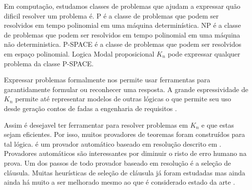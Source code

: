 



Em computação, estudamos classes de problemas que ajudam a expressar quão dificil resolver um problema é. P é a classe de problemas que podem ser resolvidos em tempo polinomial em uma máquina determinística. NP é a classe de problemas que podem ser resolvidos em tempo polinomial em uma máquina não deterministica. P-SPACE é a classe de problemas que podem ser resolvidos em espaço polinomial. %
Logica Modal proposicional $K_n$ pode expressar qualquer problema da classe P-SPACE. %

Expressar problemas formalmente nos permite usar ferramentas para garantidamente formular ou reconhecer uma resposta.
A grande espressividade de $K_n$ permite até representar modelos de outras lógicas \cite{correspkn} o que permite seu uso desde geração contos de fadas \cite{fairytale} a engenharia de requisitos \cite{reqeng}.

Assim é desejavel ter ferramentar para resolver problemas em $K_n$ e que estas sejam eficientes. Por isso, muitos provadores de teoremas foram construídos para tal lógica. \ksp é um provador automático baseado em resolução descrito em \cite{Nalon2020}. Provadores automáticos são interessantes por diminuir o risto de erro humano na prova. Um dos passos de todo provador baseado em resolução é a seleção de cláusula. Muitas heurísticas de seleção de cláusula já foram estudadas mas ainda ainda há muito a ser melhorado mesmo ao que é considerado estado da arte \cite{stephan}.

